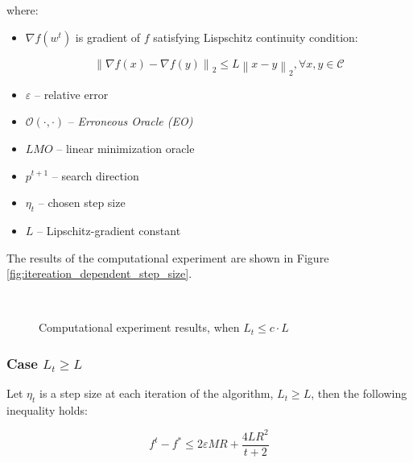 \documentclass[runningheads, final]{llncs}
\newcommand{\norm}[1]{\left\lVert#1\right\rVert}
\begin{document}
where:

\begin{itemize}
    \item $\nabla f(w^t)$ is gradient of $f$ satisfying Lispschitz continuity
          condition:

          \begin{equation}
              \norm{\nabla f(x) - \nabla f(y)}_{2} \leqslant L \norm{x - y}_{2},
              \forall x, y \in \mathcal{C}
          \end{equation}

    \item $\varepsilon$ -- relative error
    \item $\mathcal{O}(\cdot, \cdot)$ -- \textit{Erroneous Oracle (EO)}
    \item $LMO$ -- linear minimization oracle
    \item $p^{t+1}$ -- search direction
    \item $\eta_{t}$ -- chosen step size
    \item $L$ -- Lipschitz-gradient constant
\end{itemize}

The results of the computational experiment are shown in Figure \ref{fig:itereation_dependent_step_size}.

\begin{figure}[h]\label{fig:convergence_rate}
    \begin{center}
        { \hspace*{\fill} \\}
    \end{center}
    \caption{Computational experiment results, when $L_t \leqslant c \cdot L$}
\end{figure}

\subsubsection{Case $L_t \geqslant L$}

\begin{theorem}
    Let $\eta_t$ is a step size at each iteration of the algorithm,
    $L_t \geqslant L$, then the following inequality holds:

    \begin{equation}
        f^{t} - f^{*} \leqslant 2 \varepsilon M R + \frac{4 L R^2}{t+2}
    \end{equation}
\end{theorem}
\end{document}

